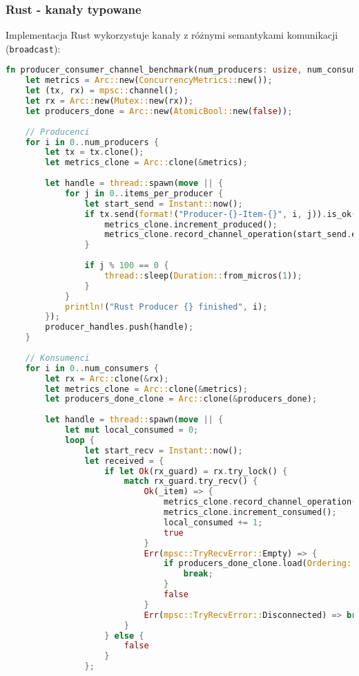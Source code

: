 \subsubsection{Rust - kanały typowane}
Implementacja Rust wykorzystuje kanały z różnymi semantykami komunikacji (\texttt{broadcast}):
\begin{lstlisting}[language=Rust, caption={Producent-Konsument w Rust z mpsc channels}, label={lst:rust_producer_consumer}]
fn producer_consumer_channel_benchmark(num_producers: usize, num_consumers: usize, items_per_producer: usize) {
    let metrics = Arc::new(ConcurrencyMetrics::new());
    let (tx, rx) = mpsc::channel();
    let rx = Arc::new(Mutex::new(rx));
    let producers_done = Arc::new(AtomicBool::new(false));
    
    // Producenci
    for i in 0..num_producers {
        let tx = tx.clone();
        let metrics_clone = Arc::clone(&metrics);
        
        let handle = thread::spawn(move || {
            for j in 0..items_per_producer {
                let start_send = Instant::now();
                if tx.send(format!("Producer-{}-Item-{}", i, j)).is_ok() {
                    metrics_clone.increment_produced();
                    metrics_clone.record_channel_operation(start_send.elapsed());
                }
                
                if j % 100 == 0 {
                    thread::sleep(Duration::from_micros(1));
                }
            }
            println!("Rust Producer {} finished", i);
        });
        producer_handles.push(handle);
    }
    
    // Konsumenci
    for i in 0..num_consumers {
        let rx = Arc::clone(&rx);
        let metrics_clone = Arc::clone(&metrics);
        let producers_done_clone = Arc::clone(&producers_done);
        
        let handle = thread::spawn(move || {
            let mut local_consumed = 0;
            loop {
                let start_recv = Instant::now();
                let received = {
                    if let Ok(rx_guard) = rx.try_lock() {
                        match rx_guard.try_recv() {
                            Ok(_item) => {
                                metrics_clone.record_channel_operation(start_recv.elapsed());
                                metrics_clone.increment_consumed();
                                local_consumed += 1;
                                true
                            }
                            Err(mpsc::TryRecvError::Empty) => {
                                if producers_done_clone.load(Ordering::Relaxed) {
                                    break;
                                }
                                false
                            }
                            Err(mpsc::TryRecvError::Disconnected) => break,
                        }
                    } else {
                        false
                    }
                };
                

\end{lstlisting}
